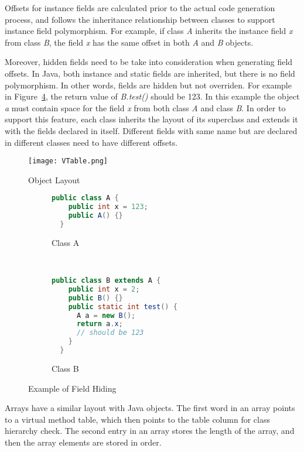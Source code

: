 \documentclass[a4paper, notitlepage]{report}
\begin{document}
Offsets for instance fields are calculated prior to the actual code generation process, and follows the inheritance relationship between classes to support instance field polymorphism. For example, if class \emph{A} inherits the instance field \emph{x} from class \emph{B}, the field \emph{x} has the same offset in both \emph{A} and \emph{B} objects.

Moreover, hidden fields need to be take into consideration when generating field offsets. In Java, both instance and static fields are inherited, but there is no field polymorphism. In other words, fields are hidden but not overriden. For example in Figure~\ref{field_hiding}, the return value of \emph{B.test()} should be 123. In this example the object \emph{a} must contain space for the field \emph{x} from both class \emph{A} and class \emph{B}. In order to support this feature, each class inherits the layout of its superclass and extends it with the fields declared in itself. Different fields with same name but are declared in different classes need to have different offsets. %

\begin{figure}
\centering
\texttt{[image: VTable.png]}
\caption{Object Layout}
\label{object}
\end{figure}

\begin{figure}
\centering
\begin{subfigure}{0.4\textwidth}
\begin{lstlisting}[language=Java, frame=single]
  public class A {
    public int x = 123;
    public A() {}
  }
\end{lstlisting}
\caption{Class A}
\label{field_a}
\end{subfigure}
~
\begin{subfigure}{0.4\textwidth}

\begin{lstlisting}[language=Java, frame=single]
  public class B extends A {
    public int x = 2;
    public B() {}
    public static int test() {
      A a = new B();
      return a.x; 
      // should be 123
    }
  }
\end{lstlisting}
\caption{Class B}
\label{field_b}
\end{subfigure}
\caption{Example of Field Hiding}
\label{field_hiding}
\end{figure}

Arrays have a similar layout with Java objects. The first word in an array points to a virtual method table, which then points to the table column for class hierarchy check. The second entry in an array stores the length of the array, and then the array elements are stored in order.
\end{document}
